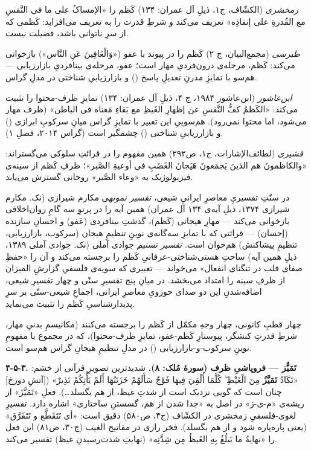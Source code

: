 \begin{RTL}
\begin{otherlanguage}{persian}
\emph{زمخشری} (الکشّاف، ج۱، ذیلِ آل عمران: ۱۳۴) کَظم را «الإمساکُ علی ما فی
النَّفسِ مع القُدرةِ علی إنفاذِه» تعریف می‌کند و شرطِ قدرت را به تعریف می‌افزاید:
کَظمی که از سرِ ناتوانی باشد، فضیلت نیست.

\emph{طبرسی} (مجمع‌البیان، ج ۲) کَظم را در پیوند با عفو («وَالْعَافِينَ عَنِ
النَّاس») بازخوانی می‌کند: کَظم، مرحله‌ی درون‌فردیِ مهار است؛ عفو، مرحله‌ی
بینافردیِ بازارزیابی --- هم‌سو با تمایزِ مدرنِ تعدیلِ پاسخ
() و بازارزیابیِ شناختی در مدلِ گراس.

\emph{ابن‌عاشور} (ابن‌عاشور ۱۹۸۴، ج ۴، ذیلِ آل عمران: ۱۳۴) تمایزِ ظرف-محتوا
را تثبیت می‌کند: «الکَظمُ کفُّ النَّفسِ عن إظهارِ الغَیظِ مع بَقاءِ مَعناه فی الباطن»
(ظرف مهار می‌شود، اما محتوا نمی‌رود). هم‌سوییِ این تعبیر با تمایزِ گراس میانِ
سرکوبِ ابرازی () و بازارزیابیِ شناختی
() چشمگیر است (گراس ۲۰۱۴، فصلِ ۱).

\emph{قشیری} (لطائف‌الإشارات، ج۱، ص۲۹۲) همین مفهوم را در قرائتِ سلوکی
می‌گستراند: «والکاظمونَ هم الذینَ یَجمَعونَ هَیَجانَ الغَضَبِ فی أوعیةِ الصَّبر»؛ ظرفِ
کَظم از سینه‌ی فیزیولوژیک به «وعاء الصَّبر» روحانی گسترش می‌یابد.

در سنّتِ تفسیریِ معاصرِ ایرانیِ شیعی، \emph{تفسیر نمونه}ی مکارم شیرازی (نک.
مکارم شیرازی ۱۳۷۴، ذیلِ آیه‌ی ۱۳۴ آل عمران) همین آیه را در پرتوِ سه گامِ
روان‌اخلاقی بازخوانی می‌کند --- مهارِ هیجانی (کَظم)، گذشتِ بینافردی (عَفو) و
احسانِ سازنده (إحسان) --- قرائتی که با تمایزِ سه‌گانه‌ی نوینِ تنظیمِ هیجان
(سرکوب، بازارزیابی، تنظیمِ پیشاکنش) هم‌خوان است. \emph{تفسیر تسنیم}ِ جوادی
آملی (نک. جوادی آملی ۱۳۸۹، ذیلِ همین آیه) ساحتِ هستی‌شناختی-عرفانیِ کَظم را
برجسته می‌کند و آن را «حفظِ صفای قلب در تنگنای انفعال» می‌خواند --- تعبیری
که سویه‌ی فلسفیِ گزارشِ المیزان از ظرفِ سینه را امتداد می‌بخشد. در میانِ پنج
تفسیرِ سنّی و چهار تفسیرِ شیعی، اضافه‌شدنِ این دو صدای حوزویِ معاصرِ ایرانی،
اجماعِ شیعی-سنّی بر سرِ پدیدارشناسیِ کَظم را تثبیت می‌نماید.

چهار قطبِ کانونی، چهار وجهِ مکمّل از کَظم را برجسته می‌کنند (مکانیسمِ بدنیِ
مهار، شرطِ قدرتِ کنشگر، پیوستارِ کَظم-عفو، تمایزِ ظرف-محتوا)، که در مجموع با
مفهومِ نوینِ سرکوب-و-بازارزیابی () در مدلِ
تنظیمِ هیجانِ گراس هم‌سو است.

\textbf{۴-۵-۳. تَمَیُّز --- فروپاشیِ ظرف (سورۀ مُلک: ۸).} شدیدترین تصویرِ قرآنی
از خشم: «تَكَادُ \textbf{تَمَيَّزُ} مِنَ الْغَيْظِ ۖ كُلَّمَا أُلْقِيَ فِيهَا فَوْجٌ سَأَلَهُمْ خَزَنَتُهَا
أَلَمْ يَأْتِكُمْ نَذِيرٌ» ({[}آتشِ دوزخ{]} چنان است که گویی نزدیک است از شدتِ غیظ،
از هم بگسلد\ldots). فعلِ «تَمَيَّزَ» از ریشه‌ی «م-ی-ز» در اصل به «جدا شدن از
هم، گسستنِ ساختاری» اشاره دارد. تفسیرِ لغوی-فلسفیِ زمخشری در الکشّاف (ج۴،
ص۵۸۰) دقیق است: «أی تَتَقَطَّع و تَتَفَرَّق» (یعنی پاره‌پاره شود و از هم بگسلد).
فخر رازی در مفاتیح الغیب (ج۳۰، ص۸۱) این فعل را «نهایةُ ما یَبلُغُ بِهِ الغَیظُ
مِن شِدَّتِه» (نهایتِ شدت‌رسیدنِ غیظ) تفسیر می‌کند.


\end{otherlanguage}
\end{RTL}
